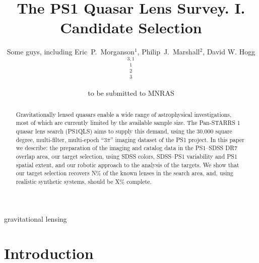 \documentclass[useAMS,usenatbib]{mn2e}
\title[The PS1QLS Survey. I.]
{The PS1 Quasar Lens Survey. I. Candidate Selection}
\author[Some guys]{%
  Some guys, including
  Eric~P.~Morganson$^{1}$,
  Philip~J.~Marshall$^{2}$,
  David W. Hogg$^{3,1}$
  \newauthor{%
  and the PS1 Collaboration}
  \medskip\\
  $^1$\mpia\\
  $^2$\oxford\\
  $^3$\nyu
}
\begin{document}
             
\date{to be submitted to MNRAS}
             
\pagerange{\pageref{firstpage}--\pageref{lastpage}}

\maketitle           

\label{firstpage}


\begin{abstract}

Gravitationally lensed quasars enable a wide range of astrophysical
investigations, most of which are currently limited by the available
sample size. The Pan-STARRS 1 quasar lens search (PS1QLS) aims to supply
this demand, using the 30,000 square degree, multi-filter, multi-epoch
``$3\pi$'' imaging dataset of the PS1 project.  In this paper we
describe: the preparation of the imaging and catalog data in the
PS1--SDSS DR7 overlap area, our target selection, using SDSS colors,
SDSS--PS1 variability and PS1 spatial extent, and our robotic approach
to the analysis of the targets. We show that our target selection
recovers N\% of the known lenses in the search area, and, using
realistic synthetic systems, should be X\% complete. 

\end{abstract}


\begin{keywords}
  gravitational lensing
\end{keywords}

\setcounter{footnote}{1}


\section{Introduction}
\label{sec:intro}






\end{document}

